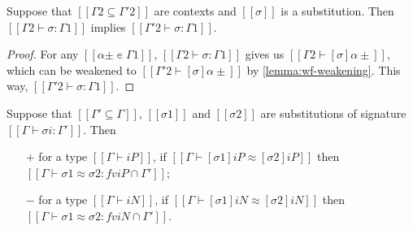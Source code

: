 \begin{lemma}
  \label{lemma:subst-range-weakening}
  Suppose that $[[{Γ2} ⊆ {Γ'2}]]$ are contexts and 
  $[[σ]]$ is a substitution.
  Then $[[Γ2 ⊢ σ : Γ1]]$ implies $[[Γ'2 ⊢ σ : Γ1]]$.
\end{lemma}
\begin{proof}
  For any $[[α± ∊ {Γ1}]]$, 
  $[[Γ2 ⊢ σ : Γ1]]$ gives us  $[[ Γ2 ⊢ [σ]α± ]]$, which can be
  weakened to $[[ Γ'2 ⊢ [σ]α± ]]$ by \cref{lemma:wf-weakening}. 
  This way, $[[Γ'2 ⊢ σ : Γ1]]$.
\end{proof}

\begin{lemma}[]
  Suppose that $[[{Γ'} ⊆ {Γ}]]$,
  $[[σ1]]$ and $[[σ2]]$ are substitutions of signature $[[Γ ⊢ σi : Γ']]$.
  Then 
  \begin{enumerate}
    \item [$+$] for a type $[[Γ ⊢ iP]]$, if $[[Γ ⊢ [σ1]iP ≈ [σ2]iP]]$ then 
    $[[Γ ⊢ σ1 ≈ σ2 : fv iP ∩ {Γ'}]]$;
    \item [$-$] for a type $[[Γ ⊢ iN]]$, if $[[Γ ⊢ [σ1]iN ≈ [σ2]iN]]$ then
    $[[Γ ⊢ σ1 ≈ σ2 : fv iN ∩ {Γ'}]]$.
  \end{enumerate}
\end{lemma}
